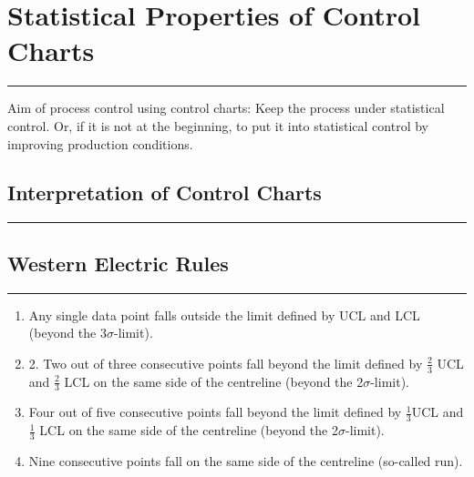 \section{Statistical Properties of Control Charts}
\noindent\rule[\linienAbstand]{\linewidth}{\linienDickeDick}
Aim of process control using control charts: Keep the process under statistical control.
Or, if it is not at the beginning, to put it into statistical control by improving production conditions.



\subsection{Interpretation of Control Charts}
\noindent\rule[\linienAbstand]{\linewidth}{\linienDicke}

\subsection{Western Electric Rules}
\noindent\rule[\linienAbstand]{\linewidth}{\linienDicke}
\begin{enumerate}
  \item Any single data point falls outside the limit defined by UCL and LCL (beyond the 3$\sigma$-limit).
  \item 2. Two out of three consecutive points fall beyond the limit defined by $\frac{2}{3}$ UCL and $\frac{2}{3}$ LCL on the same side of the centreline (beyond the 2$\sigma$-limit).
  \item Four out of five consecutive points fall beyond the limit defined by $\frac{1}{3}$UCL and $\frac{1}{3}$ LCL on the same side of the centreline (beyond the 2$\sigma$-limit).
  \item  Nine consecutive points fall on the same side of the centreline (so-called run).
\end{enumerate}


